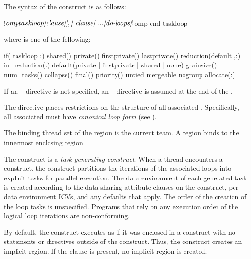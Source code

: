\begin{fortranspecific}
The syntax of the  construct is as follows:
\begin{ompfPragma}
!$omp taskloop \plc{[clause[[},\plc{] clause] ...]}
    \plc{do-loops}
\plc{[}!$omp end taskloop\plc{]}
\end{ompfPragma}
where  is one of the following:
\begin{indentedcodelist}
if(\plc{[} taskloop :\plc{] scalar-logical-expression})
shared()
private()
firstprivate()
lastprivate()
reduction(\plc{[}default ,\plc{]reduction-identifier }:)
in_reduction(:)
default(private \textnormal{|} firstprivate \textnormal{|} shared \textnormal{|} none)
grainsize()
num_tasks()
collapse()
final()
priority()
untied
mergeable
nogroup
allocate(\plc{[allocator }:\plc{] list})
\end{indentedcodelist}

If an ~ directive is not specified, an
~ directive is assumed at the end of the
.

The  directive places restrictions on the structure of all
associated . Specifically, all associated  must
have \textit{canonical loop form} (see ).
\end{fortranspecific}

\binding
The binding thread set of the  region is the current team. 
A  region binds to the innermost enclosing  region.

\descr
The  construct is a \emph{task generating construct}. When a 
thread encounters a  construct, the construct partitions the 
iterations of the associated loops into explicit tasks for parallel execution.
The data environment of each generated task is created according to the 
data-sharing attribute clauses on the  construct, per-data 
environment ICVs, and any defaults that apply. The order of the 
creation of the loop tasks is unspecified. Programs that rely on any execution 
order of the logical loop iterations are non-conforming.

By default, the  construct executes as if it was enclosed in a 
 construct with no statements or directives outside of the 
 construct. Thus, the  construct creates an 
implicit  region. If the  clause is present, 
no implicit  region is created.

